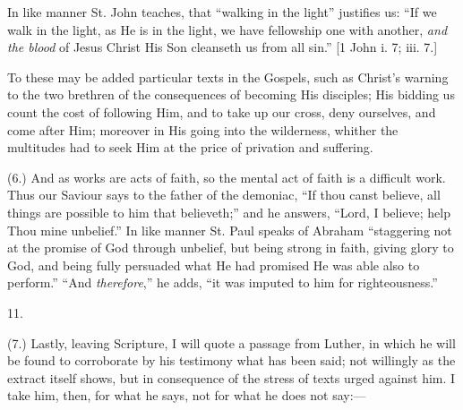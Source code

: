 In like manner St. John teaches, that ``walking in the
light'' justifies us: ``If we walk in the light, as He is in
the light, we have fellowship one with another, \emph{and the blood} of Jesus
Christ His Son cleanseth us from all sin.'' [1 John i. 7; iii. 7.]

To these may be added particular texts in the Gospels, such as
Christ's warning to the two brethren of the consequences of becoming
His disciples; His bidding us count the cost of following Him, and to
take up our cross, deny ourselves, and come after Him; moreover in His
going into the wilderness, whither the multitudes had to seek Him at
the price of privation and suffering.

(6.) And as works are acts of faith, so the mental act of faith is
a difficult work. Thus our Saviour says to the father of the demoniac,
``If thou canst believe, all things are possible to him that
believeth;'' and he answers, ``Lord, I believe; help Thou mine
unbelief.'' In like manner St. Paul speaks of Abraham
``staggering not at the promise of God through unbelief, but being
strong in faith, giving glory to God, and being fully persuaded what
He had promised He was able also to perform.'' ``And \emph{therefore},''
he adds, ``it was imputed to him for righteousness.''

11.

(7.) Lastly, leaving Scripture, I will quote a passage from Luther,
in which he will be found to corroborate by his testimony what has
been said; not willingly as the extract itself shows, but in
consequence of the stress of texts urged against him. I take him,
then, for what he says, not for what he does not say:—

